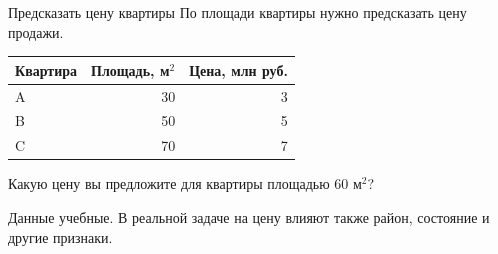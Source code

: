 \begin{frame}{Предсказать цену квартиры}
  По площади квартиры нужно предсказать цену продажи.
  \medskip\par
  \begin{tabularx}{\linewidth}{@{}Y r r@{}}
    \toprule
    \textbf{Квартира} & \textbf{Площадь, м$^2$} & \textbf{Цена, млн руб.}\\
    \midrule
    A & 30 & 3\\
    B & 50 & 5\\
    C & 70 & 7\\
    \bottomrule
  \end{tabularx}
  \medskip\par
  Какую цену вы предложите для квартиры площадью $60$ м$^2$?
  \smallskip\par
  {\small\color{acGray}Данные учебные. В реальной задаче на цену влияют также район, состояние и другие признаки.}
\end{frame}
